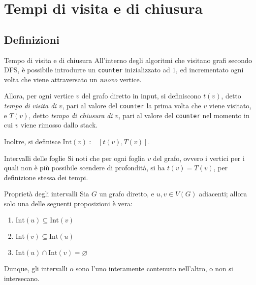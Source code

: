 \documentclass[a4paper, 12pt]{report}
\begin{document}
    \section{Tempi di visita e di chiusura}

    \subsection{Definizioni}

    \begin{frameddefn}{Tempo di visita e di chiusura}
        All'interno degli algoritmi che visitano grafi secondo DFS, è possibile introdurre un \texttt{counter} inizializzato ad $1$, ed incrementato ogni volta che viene attraversato un \textit{nuovo} vertice.

        Allora, per ogni vertice $v$ del grafo diretto in input, si definiscono $t(v)$, detto \textit{tempo di visita di $v$}, pari al valore del \texttt{counter} la prima volta che $v$ viene visitato, e $T(v)$, detto \textit{tempo di chiusura di $v$}, pari al valore del \texttt{counter} nel momento in cui $v$ viene rimosso dallo stack.

        Inoltre, si definisce $\mathrm{Int}(v) := [t(v), T(v)]$.
    \end{frameddefn}

    \begin{framedobs}{Intervalli delle foglie}
        Si noti che per ogni foglia $v$ del grafo, ovvero i vertici per i quali non è più possibile scendere di profondità, si ha $t(v) = T(v)$, per definizione stessa dei tempi.
    \end{framedobs}

    \begin{framedlem}{Proprietà degli intervalli}
        \label{Intervalli diretto}
        Sia $G$ un grafo diretto, e $u, v \in V(G)$ adiacenti; allora solo una delle seguenti proposizioni è vera:
        \begin{enumerate}[label=\roman*), font=\itshape]
            \item $\mathrm{Int}(u) \subseteq \mathrm{Int}(v)$
            \item $\mathrm{Int}(v) \subseteq \mathrm{Int}(u)$
            \item $\mathrm{Int}(u) \cap \mathrm{Int}(v) = \varnothing$
        \end{enumerate}
        
        Dunque, gli intervalli o sono l'uno interamente contenuto nell'altro, o non si intersecano.
    \end{framedlem}
\end{document}
